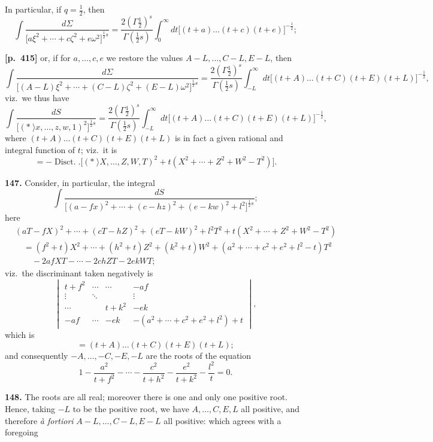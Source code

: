 \documentclass[11pt,a4paper]{article}
\providecommand{\Disct}{\operatorname{Disct.}}
\begin{document}
In particular, if $q = \tfrac{1}{2}$, then
\[
\int \frac{d\Sigma}{\bigl[a\xi^{2}+\cdots+c\zeta^{2}+e\omega^{2}\bigr]^{\tfrac{1}{2}s}} = \frac{2(\Gamma\tfrac{1}{2})^{s}}{\Gamma(\tfrac{1}{2}s)}\int_{0}^{\infty} dt\bigl[(t+a)\ldots(t+c)(t+e)\bigr]^{-\tfrac{1}{2}};
\]

\bigskip
\noindent\textbf{[p.~415]}\quad
or, if for $a,\ldots,c,e$ we restore the values $A-L,\ldots,C-L,E-L$, then
\[
\int \frac{d\Sigma}{\bigl[(A-L)\xi^{2}+\cdots+(C-L)\zeta^{2}+(E-L)\omega^{2}\bigr]^{\tfrac{1}{2}s}} = \frac{2(\Gamma\tfrac{1}{2})^{s}}{\Gamma(\tfrac{1}{2}s)}\int_{-L}^{\infty} dt\bigl[(t+A)\ldots(t+C)(t+E)(t+L)\bigr]^{-\tfrac{1}{2}},
\]
viz.\ we thus have
\[
\int \frac{dS}{\bigl[(*\!\!\:\rangle\!x,\ldots,z,w,1)^{2}\bigr]^{\tfrac{1}{2}s}} = \frac{2(\Gamma\tfrac{1}{2})^{s}}{\Gamma(\tfrac{1}{2}s)}\int_{-L}^{\infty} dt\bigl[(t+A)\ldots(t+C)(t+E)(t+L)\bigr]^{-\tfrac{1}{2}},
\]
where $(t+A)\ldots(t+C)(t+E)(t+L)$ is in fact a given rational and integral function of $t$; viz.\ it is
\[
= -\Disct.\bigl[(*\!\!\:\rangle\!X,\ldots,Z,W,T)^{2} + t(X^{2}+\cdots+Z^{2}+W^{2}-T^{2})\bigr].
\]

\textbf{147.} Consider, in particular, the integral
\[
\int \frac{dS}{\bigl[(a-fx)^{2}+\cdots+(c-hz)^{2}+(e-kw)^{2}+l^{2}\bigr]^{\tfrac{1}{2}s}};
\]
here
\begin{align*}
&(aT-fX)^{2}+\cdots+(cT-hZ)^{2}+(eT-kW)^{2}+l^{2}T^{2}+t(X^{2}+\cdots+Z^{2}+W^{2}-T^{2})\\
&\quad = (f^{2}+t)X^{2}+\cdots+(h^{2}+t)Z^{2}+(k^{2}+t)W^{2}+(a^{2}+\cdots+c^{2}+e^{2}+l^{2}-t)T^{2}\\
&\qquad - 2afXT - \cdots - 2chZT - 2ekWT;
\end{align*}
viz.\ the discriminant taken negatively is
\[
\begin{vmatrix}
t+f^{2} & \cdots & \cdots & -af\\
\vdots & \ddots & & \vdots\\
\cdots & & t+k^{2} & -ek\\
-af & \cdots & -ek & -(a^{2}+\cdots+c^{2}+e^{2}+l^{2})+t
\end{vmatrix},
\]
which is
\[
= (t+A)\ldots(t+C)(t+E)(t+L);
\]
and consequently $-A,\ldots,-C,-E,-L$ are the roots of the equation
\[
1 - \frac{a^{2}}{t+f^{2}} - \cdots - \frac{c^{2}}{t+h^{2}} - \frac{e^{2}}{t+k^{2}} - \frac{l^{2}}{t} = 0.
\]

\textbf{148.} The roots are all real; moreover there is one and only one positive root. Hence, taking $-L$ to be the positive root, we have $A,\ldots,C,E,L$ all positive, and therefore \textit{\`a fortiori} $A-L,\ldots,C-L,E-L$ all positive: which agrees with a foregoing
\end{document}
